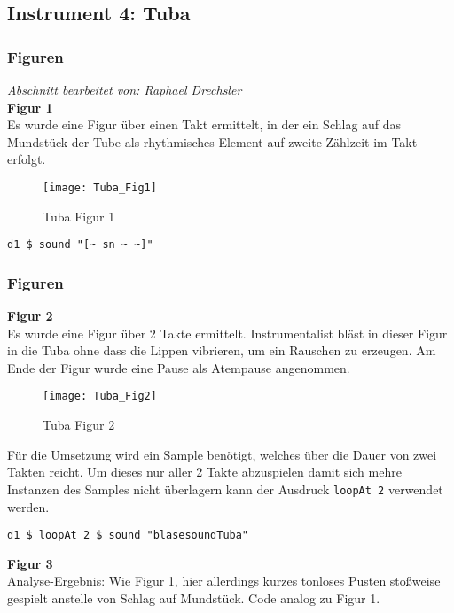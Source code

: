 \documentclass[
10pt, %
a4paper, %
oneside, %
headinclude,footinclude, %
BCOR5mm, %
]{scrartcl}
\begin{document}
\subsection{Instrument 4: Tuba}
\subsubsection{Figuren}
\textit{Abschnitt bearbeitet von: Raphael Drechsler}\\

\noindent\textbf{Figur 1}\\
Es wurde eine Figur über einen Takt ermittelt, in der ein Schlag auf das Mundstück der Tube als rhythmisches Element auf zweite Zählzeit im Takt erfolgt.\\
\begin{figure}[h]
	\centering 
	\texttt{[image: Tuba\_Fig1]} 
	\caption{Tuba Figur 1}
\end{figure}

\begin{lstlisting}
d1 $ sound "[~ sn ~ ~]"
\end{lstlisting}

\subsubsection{Figuren}
\textbf{Figur 2}\\
Es wurde eine Figur über 2 Takte ermittelt. Instrumentalist bläst in dieser Figur in die Tuba ohne dass die Lippen vibrieren, um ein Rauschen zu erzeugen. Am Ende der Figur wurde eine Pause als Atempause angenommen. 

\begin{figure}[h]
	\centering 
	\texttt{[image: Tuba\_Fig2]} 
	\caption{Tuba Figur 2}
\end{figure}

\noindent Für die Umsetzung wird ein Sample benötigt, welches über die Dauer von zwei Takten reicht. Um dieses nur aller 2 Takte abzuspielen damit sich mehre Instanzen des Samples nicht überlagern kann der Ausdruck \verb|loopAt 2| \cite{tid9} verwendet werden.
\begin{lstlisting}
d1 $ loopAt 2 $ sound "blasesoundTuba"
\end{lstlisting}

\noindent\textbf{Figur 3}\\
Analyse-Ergebnis: Wie Figur 1, hier allerdings kurzes tonloses Pusten stoßweise gespielt anstelle von Schlag auf Mundstück. Code analog zu Figur 1.\\
\end{document}
